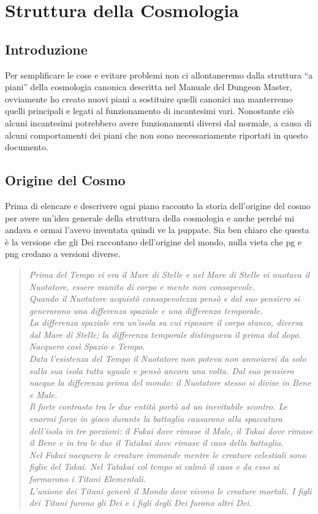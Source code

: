 \documentclass[10pt, a4paper]{report}
\begin{document}
\chapter{Struttura della Cosmologia}
\begin{multicols}{2}
\section{Introduzione}
 Per semplificare le cose e evitare problemi non ci allontaneremo dalla struttura \enquote{a piani} della cosmologia canonica descritta nel Manuale del Dungeon Master, ovviamente ho creato nuovi piani a sostituire quelli canonici ma manterremo quelli principali e legati al funzionamento di incantesimi vari. Nonostante ciò alcuni incantesimi potrebbero avere funzionamenti diversi dal normale, a causa di alcuni comportamenti dei piani che non sono necessariamente riportati in questo documento.
\section{Origine del Cosmo}
Prima di elencare e descrivere ogni piano racconto la storia dell'origine del cosmo per avere un'idea generale della struttura della cosmologia e anche perché mi andava e ormai l'avevo inventata quindi ve la puppate. Sia ben chiaro che questa è la versione che gli Dei raccontano dell'origine del mondo, nulla vieta che pg e png credano a versioni diverse. 
\\
\begin{verse}
	\textit{Prima del Tempo vi era il Mare di Stelle e nel Mare di Stelle vi nuotava il Nuotatore, essere munito di corpo e mente non consapevole.\\
		Quando il Nuotatore acquistò consapevolezza pensò e dal suo pensiero si generarono una differenza spaziale e una differenza temporale. \\
		La differenza spaziale era un'isola su cui riposare il corpo stanco, diversa dal Mare di Stelle; la differenza temporale distingueva il prima dal dopo. Nacquero così Spazio e Tempo. \\
		Data l'esistenza del Tempo il Nuotatore non poteva non annoiarsi da solo sulla sua isola tutta uguale e pensò ancora una volta. Dal suo pensiero nacque la differenza prima del mondo: il Nuotatore stesso si divise in Bene e Male. \\
		Il forte contrasto tra le due entità portò ad un inevitabile scontro. Le enormi forze in gioco durante la battaglia causarono alla spaccatura dell'isola in tre porzioni: il Fukai dove rimase il Male, il Takai dove rimase il Bene e in tra le due il Tatakai dove rimase il caos della battaglia. \\
		Nel Fukai nacquero le creature immonde mentre le creature celestiali sono figlie del Takai.
		Nel Tatakai col tempo si calmò il caos e da esso si formarono i Titani Elementali.
		\\ L'unione dei Titani generò il Mondo dove vivono le creature mortali. I figli dei Titani furono gli Dei e i figli degli Dei furono altri Dei.}
\end{verse}
\vspace{0.5cm}

\end{multicols}
\end{document}
